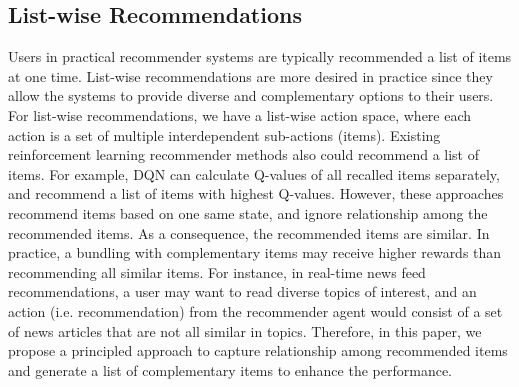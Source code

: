 \subsection{List-wise Recommendations}
Users in practical recommender systems are typically recommended a list of items at one time.  List-wise recommendations are more desired in practice since they allow the systems to provide diverse and complementary options to their users.  For list-wise recommendations, we have a list-wise action space, where each action is a set of multiple interdependent sub-actions (items). Existing reinforcement learning recommender methods also could recommend a list of items. For example, DQN\cite{mnih2013playing} can calculate Q-values of all recalled items separately, and recommend a list of items with highest Q-values. However, these approaches recommend items based on one same state, and ignore relationship among the recommended items. As a consequence, the recommended items are similar. In practice, a bundling with complementary items may receive higher rewards than recommending all similar items. For instance, in real-time news feed recommendations, a user may want to read diverse topics of interest, and an action (i.e. recommendation) from the recommender agent would consist of a set of news articles that are not all similar in topics\cite{yue2011linear}. Therefore, in this paper, we propose a principled approach to capture relationship among recommended items and generate a list of complementary items to enhance the performance. 



